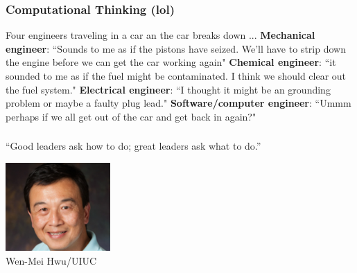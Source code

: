 \documentclass[11pt]{beamer}
\begin{document}
\begin{frame}
	\frametitle{Computational Thinking (lol)}
	\Enlarge
	\begin{itemize}
		\myitem Four engineers traveling in a car an the car breaks down ...
		\myitem \textbf{Mechanical engineer}: ``Sounds to me as if the pistons have seized. We'll have to strip down the engine before we can get the car working again"
		\myitem \textbf{Chemical engineer}: ``it sounded to me as if the fuel might be contaminated. I think we should clear out the fuel system."
		\myitem \textbf{Electrical engineer}: ``I thought it might be an grounding problem or maybe a faulty plug lead."
		\myitem \textbf{Software/computer engineer}: ``Ummm perhaps if we all get out of the car and get back in again?"
	\end{itemize}
\end{frame}
\fi

\begin{frame}
	\frametitle{}
	\Enlarge
	\vspace{5mm}
	``Good leaders ask how to do; great leaders ask what to do.''
	
	\vspace{2mm}
	\hfill \includegraphics[width=0.3\textwidth]{./img/wenmei.png} \hspace{10mm} \\
	\small \hfill Wen-Mei Hwu/UIUC\\
\end{frame}

\end{document}
